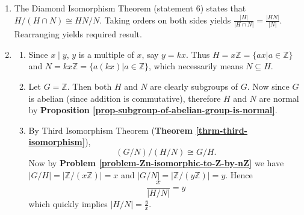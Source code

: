 \begin{enumerate}
    \item The Diamond Isomorphism Theorem (statement 6) states that $H / (H\cap N) \cong HN / N$. Taking orders on both sides yields $\frac{|H|}{|H \cap N|} = \frac{|HN|}{|N|}$. Rearranging yields required result.

    \item \begin{enumerate}[label=(\roman*)]
        \item Since $x\;|\;y$, $y$ is a multiple of $x$, say $y = kx$. Thus $H = x\mathbb{Z} = \{ax \vert a \in \mathbb{Z}\}$ and $N = kx\mathbb{Z} = \{a(kx) \vert a \in \mathbb{Z}\}$, which necessarily means $N \subseteq H$.
        \item Let $G = \mathbb{Z}$. Then both $H$ and $N$ are clearly subgroups of $G$. Now since $G$ is abelian (since addition is commutative), therefore $H$ and $N$ are normal by \textbf{Proposition \ref{prop-subgroup-of-abelian-group-is-normal}}.
        \item By Third Isomorphism Theorem (\textbf{Theorem \ref{thrm-third-isomorphism}}),
        \[
            (G/N)/(H/N) \cong G/H.
        \]
        Now by \textbf{Problem \ref{problem-Zn-isomorphic-to-Z-by-nZ}} we have $|G/H| = |\mathbb{Z}/(x\mathbb{Z})| = x$ and $|G/N| = |\mathbb{Z}/(y\mathbb{Z})| = y$. Hence
        \[
            \frac{x}{|H/N|} = y
        \]
        which quickly implies $|H/N| = \frac yx$.
    \end{enumerate}
\end{enumerate}

